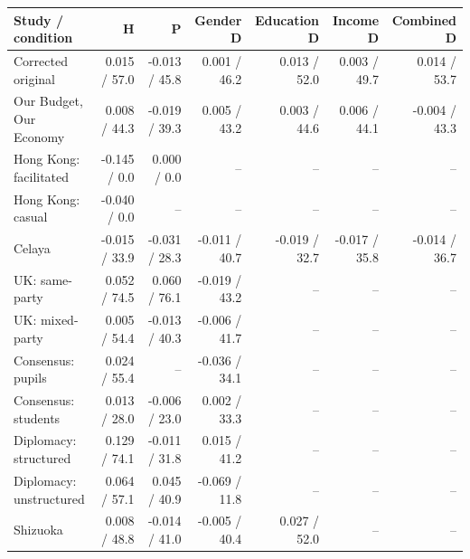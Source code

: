 
\begin{tabular}{lrrrrrr}
\toprule
Study / condition & H & P & Gender D & Education D & Income D & Combined D\\
\midrule
Corrected original & 0.015 / 57.0 & -0.013 / 45.8 & 0.001 / 46.2 & 0.013 / 52.0 & 0.003 / 49.7 & 0.014 / 53.7\\
Our Budget, Our Economy & 0.008 / 44.3 & -0.019 / 39.3 & 0.005 / 43.2 & 0.003 / 44.6 & 0.006 / 44.1 & -0.004 / 43.3\\
Hong Kong: facilitated & -0.145 / 0.0 & 0.000 / 0.0 & -- & -- & -- & --\\
Hong Kong: casual & -0.040 / 0.0 & -- & -- & -- & -- & --\\
Celaya & -0.015 / 33.9 & -0.031 / 28.3 & -0.011 / 40.7 & -0.019 / 32.7 & -0.017 / 35.8 & -0.014 / 36.7\\
\addlinespace
UK: same-party & 0.052 / 74.5 & 0.060 / 76.1 & -0.019 / 43.2 & -- & -- & --\\
UK: mixed-party & 0.005 / 54.4 & -0.013 / 40.3 & -0.006 / 41.7 & -- & -- & --\\
Consensus: pupils & 0.024 / 55.4 & -- & -0.036 / 34.1 & -- & -- & --\\
Consensus: students & 0.013 / 28.0 & -0.006 / 23.0 & 0.002 / 33.3 & -- & -- & --\\
Diplomacy: structured & 0.129 / 74.1 & -0.011 / 31.8 & 0.015 / 41.2 & -- & -- & --\\
\addlinespace
Diplomacy: unstructured & 0.064 / 57.1 & 0.045 / 40.9 & -0.069 / 11.8 & -- & -- & --\\
Shizuoka & 0.008 / 48.8 & -0.014 / 41.0 & -0.005 / 40.4 & 0.027 / 52.0 & -- & --\\
\bottomrule
\end{tabular}
